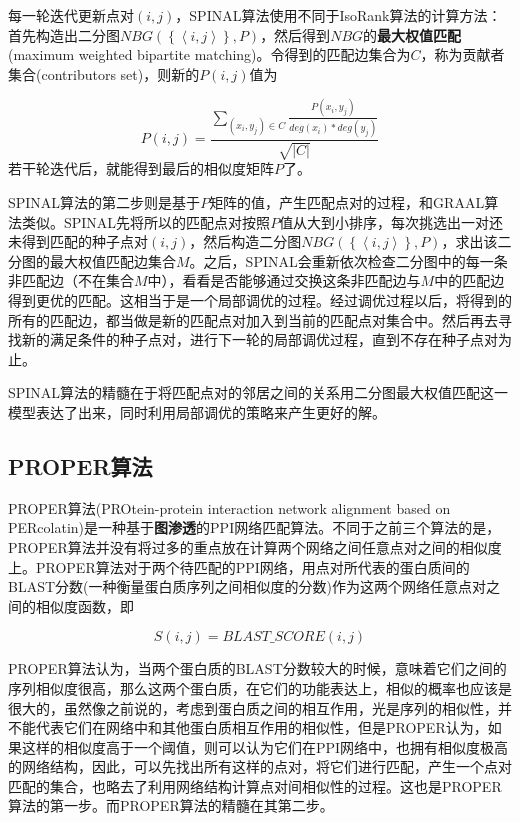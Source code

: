 每一轮迭代更新点对$(i,j)$，SPINAL算法使用不同于IsoRank算法的计算方法：首先构造出二分图$NBG(\left \{ \left \langle i,j \right \rangle \right \},P)$，然后得到$NBG$的\textbf{最大权值匹配}(maximum weighted bipartite matching)。令得到的匹配边集合为$C$，称为贡献者集合(contributors set)，则新的$P(i,j)$值为

\begin{equation}\label{spinal2}
P(i,j)=\frac{\sum_{(x_i,y_j)\in C}\frac{P(x_i,y_j)}{deg(x_i)*deg(y_j)}}{\sqrt{\left | C \right |}}
\end{equation}
若干轮迭代后，就能得到最后的相似度矩阵$P$了。

SPINAL算法的第二步则是基于$P$矩阵的值，产生匹配点对的过程，和GRAAL算法类似。SPINAL先将所以的匹配点对按照$P$值从大到小排序，每次挑选出一对还未得到匹配的种子点对$(i,j)$，然后构造二分图$NBG(\left \{ \left \langle i,j \right \rangle \right \},P)$，求出该二分图的最大权值匹配边集合$M$。之后，SPINAL会重新依次检查二分图中的每一条非匹配边（不在集合$M$中），看看是否能够通过交换这条非匹配边与$M$中的匹配边得到更优的匹配。这相当于是一个局部调优的过程。经过调优过程以后，将得到的所有的匹配边，都当做是新的匹配点对加入到当前的匹配点对集合中。然后再去寻找新的满足条件的种子点对，进行下一轮的局部调优过程，直到不存在种子点对为止。

SPINAL算法的精髓在于将匹配点对的邻居之间的关系用二分图最大权值匹配这一模型表达了出来，同时利用局部调优的策略来产生更好的解。
\subsection{PROPER算法}
PROPER算法(PROtein-protein interaction network alignment based on PERcolatin)\cite{kazemi2016proper}是一种基于\textbf{图渗透}的PPI网络匹配算法。不同于之前三个算法的是，PROPER算法并没有将过多的重点放在计算两个网络之间任意点对之间的相似度上。PROPER算法对于两个待匹配的PPI网络，用点对所代表的蛋白质间的BLAST分数\cite{altschul1990basic}(一种衡量蛋白质序列之间相似度的分数)作为这两个网络任意点对之间的相似度函数，即

\begin{equation}\label{proper1}
S(i,j)=BLAST\_SCORE(i,j)
\end{equation}

PROPER算法认为，当两个蛋白质的BLAST分数较大的时候，意味着它们之间的序列相似度很高，那么这两个蛋白质，在它们的功能表达上，相似的概率也应该是很大的，虽然像之前说的，考虑到蛋白质之间的相互作用，光是序列的相似性，并不能代表它们在网络中和其他蛋白质相互作用的相似性，但是PROPER认为，如果这样的相似度高于一个阈值，则可以认为它们在PPI网络中，也拥有相似度极高的网络结构，因此，可以先找出所有这样的点对，将它们进行匹配，产生一个点对匹配的集合，也略去了利用网络结构计算点对间相似性的过程。这也是PROPER算法的第一步。而PROPER算法的精髓在其第二步。


